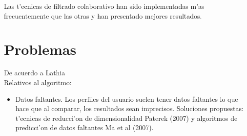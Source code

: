 \documentclass[11pt]{article}
\begin{document}
Las t'ecnicas de filtrado colaborativo han sido implementadas m'as frecuentemente que las otras y han presentado mejores resultados.


\section{Problemas}
De acuerdo a Lathia~\cite{recsys:nlathia}\\

Relativos al algoritmo:
\begin{itemize}
\item Datos faltantes. Los perfiles del usuario suelen tener datos faltantes lo que hace que al comparar, los resultados sean imprecisos. Soluciones propuestas: t'ecnicas de reducci'on de dimensionalidad Paterek (2007) y algoritmos de predicci'on de datos faltantes Ma et al (2007).
\end{itemize}
\end{document}
